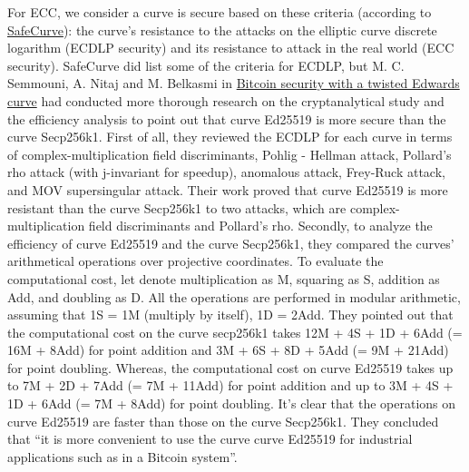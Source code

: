 For ECC, we consider a curve is secure based on these criteria (according to \href{http://safecurves.cr.yp.to/index.html}{SafeCurve}): the curve’s resistance to the attacks on the elliptic curve discrete logarithm (ECDLP security) and its resistance to attack in the real world (ECC security). SafeCurve did list some of the criteria for ECDLP, but M. C. Semmouni, A. Nitaj and M. Belkasmi in \href{https://sci-hub.se/10.1080/09720529.2019.1681673}{Bitcoin security with a twisted Edwards curve} had conducted more thorough research on the cryptanalytical study and the efficiency analysis to point out that curve Ed25519 is more secure than the curve Secp256k1. First of all, they reviewed the ECDLP for each curve in terms of complex-multiplication field discriminants, Pohlig - Hellman attack, Pollard’s rho attack (with j-invariant for speedup), anomalous attack, Frey-Ruck attack, and MOV supersingular attack. Their work proved that curve Ed25519 is more resistant than the curve Secp256k1 to two attacks, which are complex-multiplication field discriminants and Pollard’s rho. Secondly, to analyze the efficiency of curve Ed25519 and the curve Secp256k1, they compared the curves’ arithmetical operations over projective coordinates. To evaluate the computational cost, let denote multiplication as M, squaring as S, addition as Add, and doubling as D. All the operations are performed in modular arithmetic, assuming that 1S = 1M (multiply by itself), 1D = 2Add. They pointed out that the computational cost on the curve secp256k1 takes 12M + 4S + 1D + 6Add (= 16M + 8Add) for point addition and 3M + 6S + 8D + 5Add (= 9M + 21Add) for point doubling. Whereas, the computational cost on curve Ed25519 takes up to 7M + 2D + 7Add (= 7M + 11Add) for point addition and up to 3M + 4S + 1D + 6Add (= 7M + 8Add) for point doubling. It’s clear that the operations on curve Ed25519 are faster than those on the curve Secp256k1. They concluded that “it is more convenient to use the curve curve Ed25519 for industrial applications such as in a Bitcoin system”.

